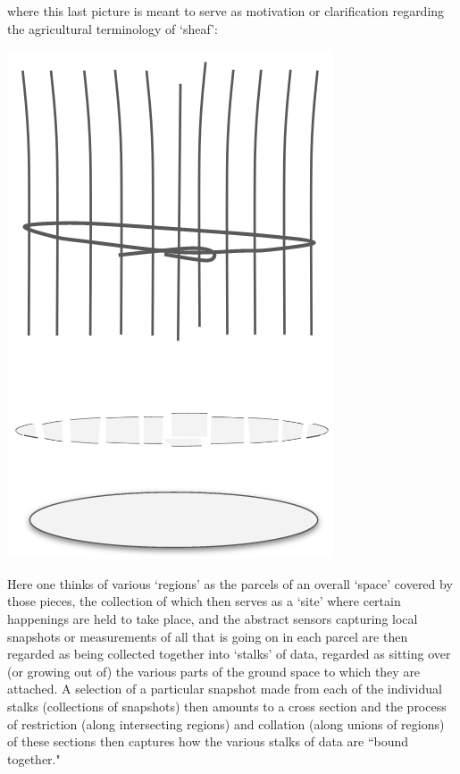 \documentclass[11pt]{book}
\theoremstyle{definition}
\theoremstyle{definition}
\theoremstyle{definition}
\theoremstyle{theorem}
\theoremstyle{definition}
\begin{document}
	where this last picture is meant to serve as motivation or clarification regarding the agricultural terminology of `sheaf':  
	\begin{center}
		\includegraphics[scale=0.2]{AgriculturalSheaf2.png}
	\end{center}
	Here one thinks of various `regions' as the parcels of an overall `space' covered by those pieces, the collection of which then serves as a `site' where certain happenings are held to take place, and the abstract sensors capturing local snapshots or measurements of all that is going on in each parcel are then regarded as being collected together into `stalks' of data, regarded as sitting over (or growing out of) the various parts of the ground space to which they are attached. A selection of a particular snapshot made from each of the individual stalks (collections of snapshots) then amounts to a cross section and the process of restriction (along intersecting regions) and collation (along unions of regions) of these sections then captures how the various stalks of data are ``bound together." \par  
\end{document}

